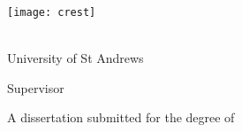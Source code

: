 \begin{titlepage}
    \begin{center}
        
        \vspace*{1.6cm}
        
        \LARGE{ \bfseries{ \inserttitle } }\par
        
        \vspace{2.5cm}
        \texttt{[image: crest]}
        \vspace{2.5cm}
        
        \Large
        {\insertauthor}
        \large
        \\University of St Andrews
    
        \vspace{0.8cm}

        Supervisor\\
        \Large 
        \insertsupervisor

        \vspace{0.8cm}
        
        \large
        

        \vspace{0.8cm}
        A dissertation submitted for the degree of
        \\ \textit{\insertdegree}\\
        \insertdate

        \vfill
        
    \end{center}
\end{titlepage}